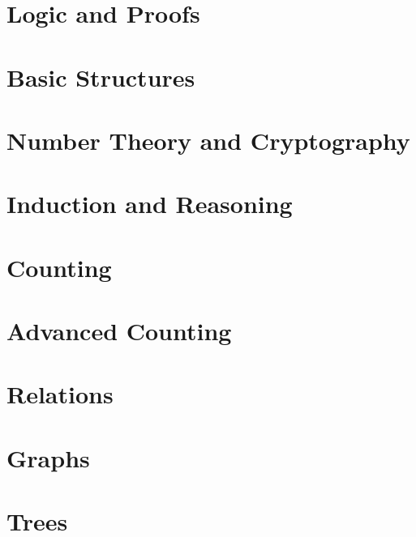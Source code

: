 \documentclass{package/notes}
\begin{document}
\chapter{Logic and Proofs}



\chapter{Basic Structures}



\chapter{Number Theory and Cryptography}



\chapter{Induction and Reasoning}



\chapter{Counting}



\chapter{Advanced Counting}



\chapter{Relations}



\chapter{Graphs}



\chapter{Trees}
\end{document}
